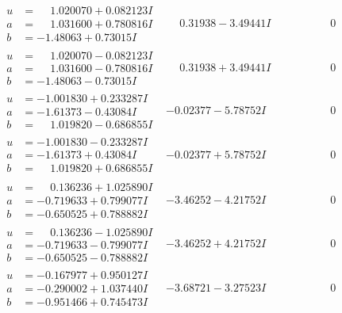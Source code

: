 \documentclass[1p]{elsarticle_modified}
\theoremstyle{definition}
\begin{document}
$$\begin{array}{c|c|c}
\begin{aligned}
u &= \phantom{-}1.020070 + 0.082123 I \\
a &= \phantom{-}1.031600 + 0.780816 I \\
b &= -1.48063 + 0.73015 I\end{aligned}
 & \phantom{-}0.31938 - 3.49441 I & \phantom{-0.000000 } 0 \\ \hline\begin{aligned}
u &= \phantom{-}1.020070 - 0.082123 I \\
a &= \phantom{-}1.031600 - 0.780816 I \\
b &= -1.48063 - 0.73015 I\end{aligned}
 & \phantom{-}0.31938 + 3.49441 I & \phantom{-0.000000 } 0 \\ \hline\begin{aligned}
u &= -1.001830 + 0.233287 I \\
a &= -1.61373 - 0.43084 I \\
b &= \phantom{-}1.019820 - 0.686855 I\end{aligned}
 & -0.02377 - 5.78752 I & \phantom{-0.000000 } 0 \\ \hline\begin{aligned}
u &= -1.001830 - 0.233287 I \\
a &= -1.61373 + 0.43084 I \\
b &= \phantom{-}1.019820 + 0.686855 I\end{aligned}
 & -0.02377 + 5.78752 I & \phantom{-0.000000 } 0 \\ \hline\begin{aligned}
u &= \phantom{-}0.136236 + 1.025890 I \\
a &= -0.719633 + 0.799077 I \\
b &= -0.650525 + 0.788882 I\end{aligned}
 & -3.46252 - 4.21752 I & \phantom{-0.000000 } 0 \\ \hline\begin{aligned}
u &= \phantom{-}0.136236 - 1.025890 I \\
a &= -0.719633 - 0.799077 I \\
b &= -0.650525 - 0.788882 I\end{aligned}
 & -3.46252 + 4.21752 I & \phantom{-0.000000 } 0 \\ \hline\begin{aligned}
u &= -0.167977 + 0.950127 I \\
a &= -0.290002 + 1.037440 I \\
b &= -0.951466 + 0.745473 I\end{aligned}
 & -3.68721 - 3.27523 I & \phantom{-0.000000 } 0 \\ \hline\begin{aligned}

\end{aligned}
\end{array}$$
\end{document}
